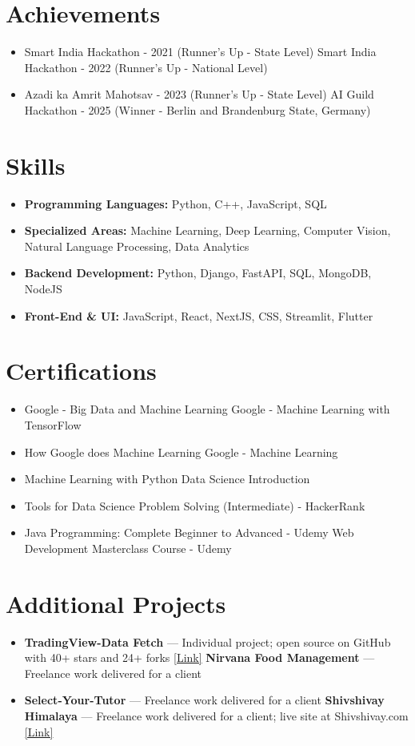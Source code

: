 \documentclass[a4paper,10pt]{article}
\begin{document}
\section*{Achievements}
\begin{itemize}
\item Smart India Hackathon - 2021 (Runner's Up - State Level) \hfill Smart India Hackathon - 2022 (Runner's Up - National Level)
\item Azadi ka Amrit Mahotsav - 2023 (Runner's Up - State Level) \hfill AI Guild Hackathon - 2025 (Winner - Berlin and Brandenburg State, Germany)
\end{itemize}

\section*{Skills}
\begin{itemize}
  \item \textbf{Programming Languages:} Python, C++, JavaScript, SQL
  \item \textbf{Specialized Areas:} Machine Learning, Deep Learning, Computer Vision, Natural Language Processing, Data Analytics
  \item \textbf{Backend Development:} Python, Django, FastAPI, SQL, MongoDB, NodeJS
  \item \textbf{Front-End \& UI:} JavaScript, React, NextJS, CSS, Streamlit, Flutter
\end{itemize}

\section*{Certifications}
\begin{itemize}
\item Google - Big Data and Machine Learning \hfill Google - Machine Learning with TensorFlow
\item How Google does Machine Learning \hfill Google - Machine Learning
\item Machine Learning with Python \hfill Data Science Introduction
\item Tools for Data Science \hfill Problem Solving (Intermediate) - HackerRank
\item Java Programming: Complete Beginner to Advanced - Udemy \hfill Web Development Masterclass Course - Udemy
\end{itemize}

\section*{Additional Projects}
\begin{itemize}
\item \textbf{TradingView-Data Fetch} — Individual project; open source on GitHub with 40+ stars and 24+ forks \href{https://github.com/ravalmeet/TradingView}{[Link]} \hfill \textbf{Nirvana Food Management} — Freelance work delivered for a client
\item \textbf{Select-Your-Tutor} — Freelance work delivered for a client \hfill \textbf{Shivshivay Himalaya} — Freelance work delivered for a client; live site at Shivshivay.com \href{Shivshivay.com}{[Link]}
\end{itemize}
\end{document}
